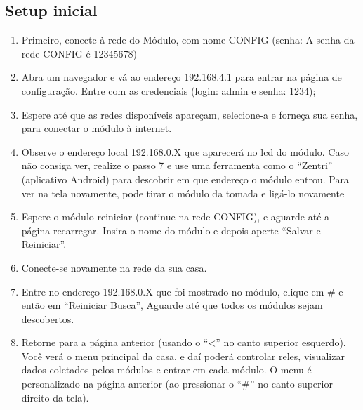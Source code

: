 \subsection{Setup inicial}
\begin{enumerate}
	\item Primeiro, conecte à rede \wwifi do Módulo, com nome CONFIG (senha: A senha da rede CONFIG é 12345678)
	\item Abra um navegador e vá ao endereço 192.168.4.1 para entrar na página de configuração. Entre com as credenciais (login: admin e senha: 1234);
	\item Espere até que as redes disponíveis apareçam, selecione-a e forneça sua senha, para conectar o módulo à internet.
	\item Observe o endereço local 192.168.0.X que aparecerá no lcd do módulo. Caso não consiga ver, realize o passo 7 e use uma ferramenta como o “Zentri” (aplicativo Android) para descobrir em que endereço o módulo entrou. Para ver na tela novamente, pode tirar o módulo da tomada e ligá-lo novamente
	\item Espere o módulo reiniciar (continue na rede CONFIG), e aguarde até a página recarregar. Insira o nome do módulo e depois aperte “Salvar e Reiniciar”.
	\item Conecte-se novamente na rede \wwifi da sua casa.
	\item Entre no endereço 192.168.0.X que foi mostrado no módulo, clique em \# e então em “Reiniciar Busca”, Aguarde até que todos os módulos sejam descobertos.
	\item Retorne para a página anterior (usando o “<” no canto superior esquerdo). Você verá o menu principal da casa, e daí poderá controlar reles, visualizar dados coletados pelos módulos e entrar em cada módulo. O menu é personalizado na página anterior (ao pressionar o “\#” no canto superior direito da tela).
\end{enumerate}
